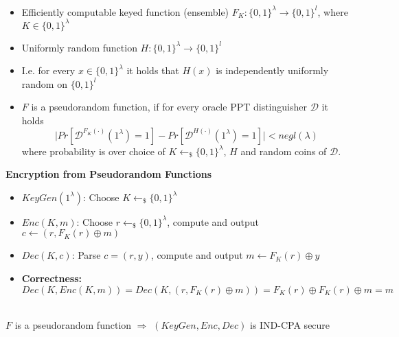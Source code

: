 \begin{definition}\ 
    \begin{itemize}
        \item Efficiently computable keyed function (ensemble) $F_K: \{0,1\}^{\lambda} \to \{0,1\}^l$, where $K \in \{0,1\}^{\lambda}$
        \item Uniformly random function $H: \{0,1\}^{\lambda} \to \{0,1\}^l$
        \item I.e. for every $x \in \{0,1\}^{\lambda}$ it holds that $H(x)$ is independently uniformly random on $\{0,1\}^l$
        \item $F$ is a pseudorandom function, if for every oracle PPT distinguisher $\mathcal{D}$ it holds
        $$\vert Pr[\mathcal{D}^{F_K (\cdot)}(1^{\lambda})=1]-Pr[\mathcal{D}^{H (\cdot)}(1^{\lambda})=1] \vert < negl(\lambda)$$
        where probability is over choice of $K \leftarrow_{\$} \{0,1\}^{\lambda}$, $H$ and random coins of $\mathcal{D}$.\newline
    \end{itemize}
\end{definition}


\textbf{Encryption from Pseudorandom Functions}
\begin{itemize}
    \item $KeyGen(1^{\lambda})$: Choose $K \leftarrow_{\$} \{0,1\}^{\lambda}$
    \item $Enc(K,m)$: Choose $r \leftarrow_{\$} \{0,1\}^{\lambda}$, compute and output $c \leftarrow (r,F_K(r) \oplus m)$
    \item $Dec(K,c)$: Parse $c=(r,y)$, compute and output $m \leftarrow F_K(r) \oplus y$
    \item \textbf{Correctness:}
    $$Dec(K,Enc(K,m))=Dec(K,(r,F_K(r) \oplus m))=F_K(r) \oplus F_K(r) \oplus m = m$$\newline
\end{itemize}


\begin{theorem}[IND-CPA Security]\ \\
$F$ is a pseudorandom function $\Rightarrow$ $(KeyGen,Enc,Dec)$ is IND-CPA secure\newline
\end{theorem}

